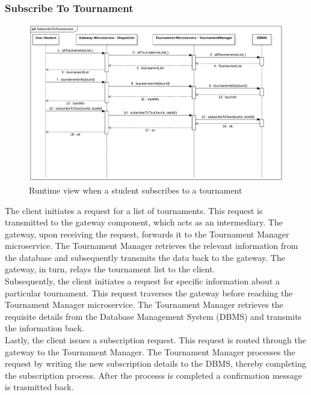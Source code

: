 \subsubsection*{Subscribe To Tournament}
\begin{figure}[h!]
    \centering
    \includegraphics[width=1\linewidth]{2.ArchitecturalDesign/res/subscribeToTournament.png}
    \caption{Runtime view when a student subscribes to a tournament}
    \label{fig:subsTournament}
\end{figure}

The client initiates a request for a list of tournaments. This request is transmitted to the gateway component, which acts as an intermediary.
The gateway, upon receiving the request, forwards it to the Tournament Manager microservice. The Tournament Manager retrieves the relevant information from the database and subsequently transmits the data back to the gateway.
The gateway, in turn, relays the tournament list to the client.\\
Subsequently, the client initiates a request for specific information about a particular tournament. This request traverses the gateway before reaching the Tournament Manager microservice. The Tournament Manager retrieves the requisite details from the Database Management System (DBMS) and transmits the information back.\\
Lastly, the client issues a subscription request. This request is routed through the gateway to the Tournament Manager. The Tournament Manager processes the request by writing the new subscription details to the DBMS, thereby completing the subscription process. After the processs is completed a confirmation message is trasmitted back.

\newpage

